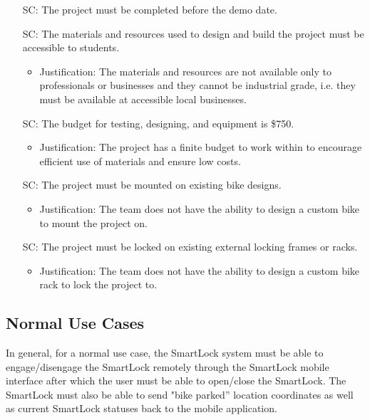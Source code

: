 \documentclass[12pt]{article}
\newcounter{reqnum} %
\begin{document}
\begin{itemize}

\item[SC\refstepcounter{reqnum}\thereqnum\label{SC1}:] The project must be completed before the demo date.

\item[SC\refstepcounter{reqnum}\thereqnum\label{SC2}:] The materials and resources used to design and build the project must be accessible to students.
	\begin{itemize}
		\item Justification: The materials and resources are not available only to professionals or businesses and they cannot be industrial grade, i.e. they must be available at accessible local businesses.
	\end{itemize} 

\item[SC\refstepcounter{reqnum}\thereqnum\label{SC3}:] The budget for testing, designing, and equipment is \$750.
	\begin{itemize}
		\item Justification: The project has a finite budget to work within to encourage efficient use of materials and ensure low costs.
	\end{itemize} 
	
\item[SC\refstepcounter{reqnum}\thereqnum\label{SC4}:] The project must be mounted on existing bike designs.
	\begin{itemize}
		\item Justification: The team does not have the ability to design a custom bike to mount the project on. 
	\end{itemize} 	
	
\item[SC\refstepcounter{reqnum}\thereqnum\label{SC5}:] The project must be locked on existing external locking frames or racks.
	\begin{itemize}
		\item Justification: The team does not have the ability to design a custom bike rack to lock the project to. 
	\end{itemize} 

\end{itemize}

\subsection{Normal Use Cases}
In general, for a normal use case, the SmartLock system must be able to engage/disengage the SmartLock remotely through the SmartLock mobile interface after which the user must be able to open/close the SmartLock.  The SmartLock must also be able to send "bike parked” location coordinates as well as current SmartLock statuses back to the mobile application. 
\end{document}

